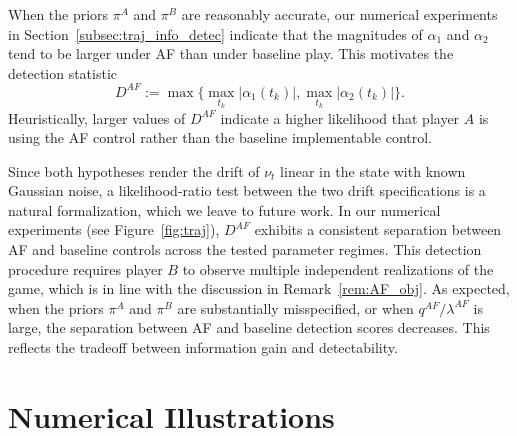 \documentclass[letterpaper, 10 pt, conference]{ieeeconf}
\begin{document}
When the priors \(\pi^A\) and \(\pi^B\) are reasonably accurate, our numerical experiments in Section~\ref{subsec:traj_info_detec} indicate that the magnitudes of \(\alpha_1\) and \(\alpha_2\) tend to be larger under AF than under baseline play. This motivates the detection statistic
\begin{equation}\label{eq:detection_mag}
    D^{AF} := \max\big\{ \max\limits_{t_k} \big|\alpha_1(t_k)\big|, \max\limits_{t_k} \big|\alpha_2(t_k)\big| \big\}.
\end{equation}
Heuristically, larger values of \(D^{AF}\) indicate a higher likelihood that player \(A\) is using the AF control rather than the baseline implementable control.

Since both hypotheses render the drift of $\nu_t$ linear in the state with known Gaussian noise, a likelihood-ratio test between the two drift specifications is a natural formalization, which we leave to future work.  In our numerical experiments (see Figure~\ref{fig:traj}), \(D^{AF}\) exhibits a consistent separation between AF and baseline controls across the tested parameter regimes. This detection procedure requires player \(B\) to observe multiple independent realizations of the game, which is in line with the discussion in Remark~\ref{rem:AF_obj}. As expected, when the priors \(\pi^A\) and \(\pi^B\) are substantially misspecified, or when \(q^{AF}/\lambda^{AF}\) is large, the separation between AF and baseline detection scores decreases. This reflects the tradeoff between information gain and detectability. 

 



\section{Numerical Illustrations}\label{sec:numerical_results}
\end{document}
